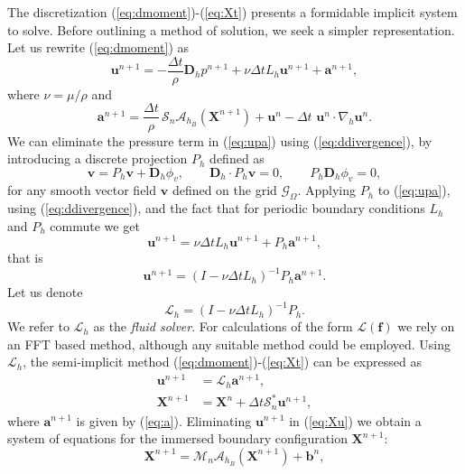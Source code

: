 \documentclass[preprint,12pt]{elsarticle}
\newcommand{\B}[1]{\mathbf{#1}}
\newcommand{\C}[1]{\mathcal{#1}}
\begin{document}
The discretization (\ref{eq:dmoment})-(\ref{eq:Xt}) presents a formidable implicit system to solve. Before outlining a method of solution,  we seek a simpler representation.
Let us rewrite (\ref{eq:dmoment}) as
\begin{equation}
\B{u}^{n+1}=-\frac{\Delta t}{\rho} \B{D}_h p^{n+1} + \nu\Delta t L_h \B{u}^{n+1} + \B{a}^{n+1},
\label{eq:upa}
\end{equation}
where $\nu=\mu/\rho$ and
\begin{equation}
\B{a}^{n+1}= \frac{\Delta t}{\rho}\, \C{S}_n\C{A}_{h_B}(\B{X}^{n+1})+\B{u}^n-\Delta t \, \, \B{u}^n \cdot \nabla_h \B{u}^n. \label{eq:a}
\end{equation}
We can eliminate the pressure term in (\ref{eq:upa}) using (\ref{eq:ddivergence}), by introducing a discrete projection
$P_h$ defined as 
\begin{equation}
\B{v} = P_h \B{v} + \B{D}_h \phi_v, \qquad \B{D}_h \cdot P_h \B{v} =0, \qquad P_h \B{D}_h \phi_v=0,
\end{equation}
for any smooth vector field $\B{v}$ defined on the grid $\C{G}_{\Omega}$. Applying $P_h$ to (\ref{eq:upa}), using  (\ref{eq:ddivergence}),  and the fact that for periodic boundary conditions $L_h$ and $P_h$ commute we get
\begin{equation}
\B{u}^{n+1}= \nu\Delta t L_h \B{u}^{n+1} + P_h \B{a}^{n+1},
\end{equation}
that is
\begin{equation}
\B{u}^{n+1} = (I -\nu\Delta t L_h)^{-1}  P_h \B{a}^{n+1}.
\end{equation}
Let us denote
\begin{equation}
\C{L}_h = (I -\nu\Delta t L_h)^{-1}  P_h. \label{eq:L_h}
\end{equation}
We refer to $\C{L}_h$ as the \textit{fluid solver}.
For calculations of the form $\C{L}(\B{f})$ we rely on an FFT based method, although any suitable method could be employed.
Using $\C{L}_h$,  the semi-implicit method  (\ref{eq:dmoment})-(\ref{eq:Xt})  can be expressed as
\begin{align}
\B{u}^{n+1} &= \C{L}_h \B{a}^{n+1}, \label{eq:uL} \\
\B{X}^{n+1}&=\B{X}^n +\Delta t\C{S}^*_n\B{u}^{n+1}, \label{eq:Xu}
\end{align}
where $ \B{a}^{n+1}$ is given by (\ref{eq:a}). Eliminating $\B{u}^{n+1}$ in (\ref{eq:Xu}) we obtain  a system of equations for the immersed boundary configuration $\B{X}^{n+1}$:
\begin{equation}
\B{X}^{n+1} = \C{M}_n\C{A}_{h_B} (\B{X}^{n+1}) + \B{b}^n, \label{eq:Xnl}
\end{equation}
\end{document}

